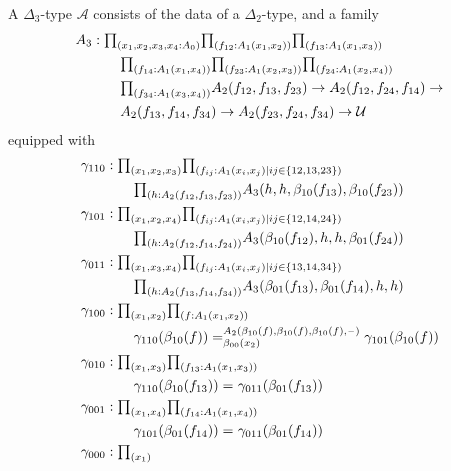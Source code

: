 \begin{defn}
A $\Delta_3$-type $\mathcal{A}$ consists of the data of a $\Delta_2$-type, and a family
\begin{align*}
A_3 & : \prd{x_1,x_2,x_3,x_4:A_0}{f_{12}:A_1(x_1,x_2)}{f_{13}:A_1(x_1,x_3)} \\
& \qquad \prd{f_{14}:A_1(x_1,x_4)}{f_{23}:A_1(x_2,x_3)}{f_{24}:A_1(x_2,x_4)}\\
& \qquad \prd{f_{34}:A_1(x_3,x_4)} A_2(f_{12},f_{13},f_{23})\to A_2(f_{12},f_{24},f_{14})\to \\
& \qquad A_2(f_{13},f_{14},f_{34}) \to A_2(f_{23},f_{24},f_{34})\to\UU
\end{align*}
equipped with
\begin{align*}
\gamma_{110} & : \prd{x_1,x_2,x_3}{f_{ij}:A_1(x_i,x_j)\mid ij\in\{12,13,23\}} \\
& \qquad \prd{h:A_2(f_{12},f_{13},f_{23})} A_3(h,h,\beta_{10}(f_{13}),\beta_{10}(f_{23})) \\
\gamma_{101} & : \prd{x_1,x_2,x_4}{f_{ij}:A_1(x_i,x_j)\mid ij\in\{12,14,24\}}\\
& \qquad \prd{h:A_2(f_{12},f_{14},f_{24})} A_3(\beta_{10}(f_{12}),h,h,\beta_{01}(f_{24})) \\
\gamma_{011} & : \prd{x_1,x_3,x_4}{f_{ij}:A_1(x_i,x_j)\mid ij\in\{13,14,34\}} \\
& \qquad \prd{h:A_2(f_{13},f_{14},f_{34})} A_3(\beta_{01}(f_{13}),\beta_{01}(f_{14}),h,h) \\
\gamma_{100} & : \prd{x_1,x_2}{f:A_1(x_1,x_2)} \\
&\qquad \dpath{A_2(\beta_{10}(f),\beta_{10}(f),\beta_{10}(f),\blank)}{\beta_{00}(x_2)}{\gamma_{110}(\beta_{10}(f))}{\gamma_{101}(\beta_{10}(f))}\\
\gamma_{010} & : \prd{x_1,x_3}{f_{13}:A_1(x_1,x_3)}\\
&\qquad \dpath{}{}{\gamma_{110}(\beta_{10}(f_{13}))}{\gamma_{011}(\beta_{01}(f_{13}))}\\
\gamma_{001} & : \prd{x_1,x_4}{f_{14}:A_1(x_1,x_4)}\\
&\qquad \dpath{}{}{\gamma_{101}(\beta_{01}(f_{14}))}{\gamma_{011}(\beta_{01}(f_{14}))}\\
\gamma_{000} & : \prd{x_1}
\end{align*} 
\end{defn}

